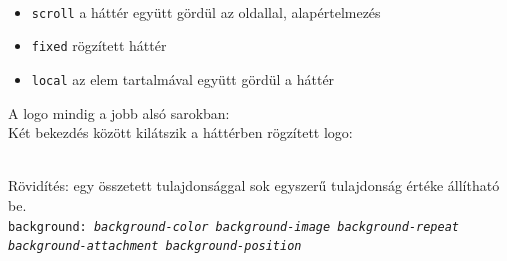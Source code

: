 \begin{frame}
  \begin{description}[m]
    \item[\texttt{background-attachment}] \hfill \\
      \begin{itemize}
        \item \texttt{scroll} a háttér együtt gördül az oldallal, 
        alapértelmezés
        \item \texttt{fixed} rögzített háttér
        \item \texttt{local} az elem tartalmával együtt gördül a háttér
      \end{itemize}
      \vfill
      A logo mindig a jobb alsó sarokban: 
      \\
      Két bekezdés között kilátszik a háttérben rögzített logo: 
  \end{description}
\end{frame}

\begin{frame}
  \begin{description}[m]
    \item[\texttt{background}] \hfill \\ Rövidítés: egy összetett 
    tulajdonsággal sok egyszerű tulajdonság értéke állítható 
    be. \\
    \texttt{background: \emph{background-color background-image 
    background-repeat}\\
    \qquad\emph{background-attachment background-position}}
  \end{description}
  \begin{columns}[T]
      \begin{exampleblock}{}
        \fontsize{7}{8} \selectfont
        
      \end{exampleblock}
      \begin{exampleblock}{}
        \fontsize{7}{8} \selectfont
        
      \end{exampleblock}
  \end{columns} 
\end{frame}

